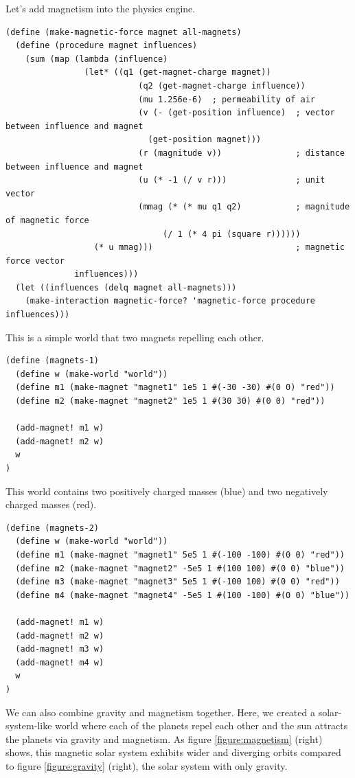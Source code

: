 \documentclass{article}
\begin{document}
Let's add magnetism into the physics engine. 

\begin{verbatim}
(define (make-magnetic-force magnet all-magnets)
  (define (procedure magnet influences)
    (sum (map (lambda (influence)
                (let* ((q1 (get-magnet-charge magnet))
                           (q2 (get-magnet-charge influence))
                           (mu 1.256e-6)  ; permeability of air
                           (v (- (get-position influence)  ; vector between influence and magnet
                             (get-position magnet)))
                           (r (magnitude v))               ; distance between influence and magnet
                           (u (* -1 (/ v r)))              ; unit vector
                           (mmag (* (* mu q1 q2)           ; magnitude of magnetic force
                                (/ 1 (* 4 pi (square r))))))
                  (* u mmag)))                             ; magnetic force vector
              influences)))
  (let ((influences (delq magnet all-magnets)))
    (make-interaction magnetic-force? 'magnetic-force procedure influences)))
\end{verbatim}

This is a simple world that two magnets repelling each other.
\begin{verbatim}
(define (magnets-1)
  (define w (make-world "world"))
  (define m1 (make-magnet "magnet1" 1e5 1 #(-30 -30) #(0 0) "red"))
  (define m2 (make-magnet "magnet2" 1e5 1 #(30 30) #(0 0) "red"))

  (add-magnet! m1 w)
  (add-magnet! m2 w)
  w
)
\end{verbatim}

This world contains two positively charged masses (blue) and two negatively charged masses (red).
\begin{verbatim}
(define (magnets-2)
  (define w (make-world "world"))
  (define m1 (make-magnet "magnet1" 5e5 1 #(-100 -100) #(0 0) "red"))
  (define m2 (make-magnet "magnet2" -5e5 1 #(100 100) #(0 0) "blue"))
  (define m3 (make-magnet "magnet3" 5e5 1 #(-100 100) #(0 0) "red"))
  (define m4 (make-magnet "magnet4" -5e5 1 #(100 -100) #(0 0) "blue"))

  (add-magnet! m1 w)
  (add-magnet! m2 w)
  (add-magnet! m3 w)
  (add-magnet! m4 w)
  w
)
\end{verbatim}

We can also combine gravity and magnetism together. Here, we created a solar-system-like world where each of the planets repel each other and the sun attracts the planets via gravity and magnetism. As figure \ref{figure:magnetism} (right) shows, this magnetic solar system exhibits wider and diverging orbits compared to figure \ref{figure:gravity} (right), the solar system with only gravity. 
\end{document}
